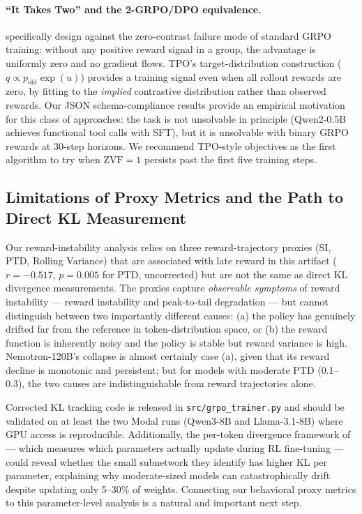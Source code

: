 \documentclass{article}
\begin{document}
\paragraph{``It Takes Two'' and the 2-GRPO/DPO equivalence.}
\citet{wu2025grpo_dpo} specifically design against the zero-contrast failure mode
of standard GRPO training: without any positive reward signal in a group,
the advantage is uniformly zero and no gradient flows.
TPO's target-distribution construction ($q \propto p_\text{old} \exp(u)$)
provides a training signal even when all rollout rewards are zero, by fitting
to the \emph{implied} contrastive distribution rather than observed rewards.
Our JSON schema-compliance results provide an empirical motivation for this class of
approaches: the task is not unsolvable in principle (Qwen2-0.5B achieves
functional tool calls with SFT), but it is unsolvable with binary GRPO
rewards at 30-step horizons.
We recommend TPO-style objectives as the first algorithm to try when
$\text{ZVF} = 1$ persists past the first five training steps.

\subsection{Limitations of Proxy Metrics and the Path to Direct KL Measurement}
\label{sec:discuss_kl}

Our reward-instability analysis relies on three reward-trajectory proxies (SI, PTD,
Rolling Variance) that are associated with late reward in this artifact
($r = -0.517$, $p = 0.005$ for PTD, uncorrected) but are not the same as direct
KL divergence measurements.
The proxies capture \emph{observable symptoms} of reward instability --- reward
instability and peak-to-tail degradation --- but cannot distinguish between
two importantly different causes: (a) the policy has genuinely drifted far from
the reference in token-distribution space, or (b) the reward function is
inherently noisy and the policy is stable but reward variance is high.
Nemotron-120B's collapse is almost certainly case (a), given that its reward
decline is monotonic and persistent; but for models with moderate PTD (0.1--0.3),
the two causes are indistinguishable from reward trajectories alone.

Corrected KL tracking code is released in \texttt{src/grpo\_trainer.py} and
should be validated on at least the two Modal runs (Qwen3-8B and
Llama-3.1-8B) where GPU access is reproducible.
Additionally, the per-token divergence framework of \citet{liu2025rlsubnetworks}
--- which measures which parameters actually update during RL fine-tuning ---
could reveal whether the small subnetwork they identify has higher KL per
parameter, explaining why moderate-sized models can catastrophically drift
despite updating only 5--30\% of weights.
Connecting our behavioral proxy metrics to this parameter-level analysis is a
natural and important next step.
\end{document}
